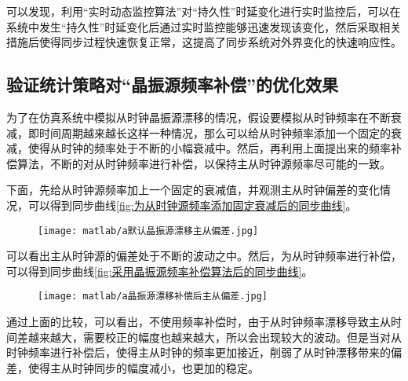 可以发现，利用“实时动态监控算法”对“持久性”时延变化进行实时监控后，可以在系统中发生“持久性”时延变化后通过实时监控能够迅速发现该变化，然后采取相关措施后使得同步过程快速恢复正常，这提高了同步系统对外界变化的快速响应性。


\subsection{验证统计策略对“晶振源频率补偿”的优化效果}
为了在仿真系统中模拟从时钟晶振源漂移的情况，假设要模拟从时钟频率在不断衰减，即时间周期越来越长这样一种情况，那么可以给从时钟频率添加一个固定的衰减，使得从时钟的频率处于不断的小幅衰减中。然后，再利用上面提出来的频率补偿算法，不断的对从时钟频率进行补偿，以保持主从时钟源频率尽可能的一致。

下面，先给从时钟源频率加上一个固定的衰减值，并观测主从时钟偏差的变化情况，可以得到同步曲线\ref{fig:为从时钟源频率添加固定衰减后的同步曲线}。
\begin{figure}[!hbp]
  \centering
  \begin{minipage}[b]{1\textwidth}
    \captionstyle{\centering}
    \centering
    \texttt{[image: matlab/a默认晶振源漂移主从偏差.jpg]}
  \end{minipage}     
\end{figure}

可以看出主从时钟源的偏差处于不断的波动之中。然后，为从时钟频率进行补偿，可以得到同步曲线\ref{fig:采用晶振源频率补偿算法后的同步曲线}。
\begin{figure}[htbp]
  \centering
  \begin{minipage}[b]{1\textwidth}
    \captionstyle{\centering}
    \centering
    \texttt{[image: matlab/a晶振源漂移补偿后主从偏差.jpg]}
  \end{minipage}     
\end{figure}

通过上面的比较，可以看出，不使用频率补偿时，由于从时钟频率漂移导致主从时间差越来越大，需要校正的幅度也越来越大，所以会出现较大的波动。但是当对从时钟频率进行补偿后，使得主从时钟的频率更加接近，削弱了从时钟漂移带来的偏差，使得主从时钟同步的幅度减小，也更加的稳定。

